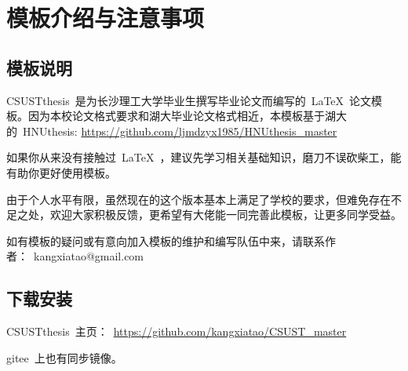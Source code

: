 

\chapter{模板介绍与注意事项}
\section{模板说明}

CSUSTthesis~是为长沙理工大学毕业生撰写毕业论文而编写的~\LaTeX~论文模板。因为本校论文格式要求和湖大毕业论文格式相近，本模板基于湖大的~HNUthesis: \url{https://github.com/ljmdzyx1985/HNUthesis_master}

如果你从来没有接触过~\LaTeX~，建议先学习相关基础知识，磨刀不误砍柴工，能有助你更好使用模板。~\cite{huwei}\cite{deng01a}

由于个人水平有限，虽然现在的这个版本基本上满足了学校的要求，但难免存在不足之处，欢迎大家积极反馈，更希望有大佬能一同完善此模板，让更多同学受益。

如有模板的疑问或有意向加入模板的维护和编写队伍中来，请联系作者：~kangxiatao@gmail.com

\section{下载安装}
CSUSTthesis~主页：~\url{https://github.com/kangxiatao/CSUST_master} 

gitee~上也有同步镜像。

